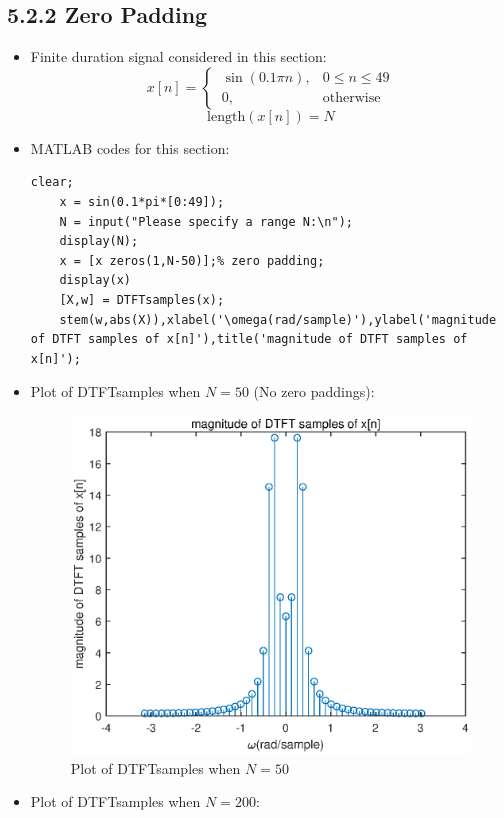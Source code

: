 \documentclass[onecolumn,oneside]{SUSTechHomework}
\begin{document}
\subsection*{5.2.2 Zero Padding}
\begin{itemize}
	\item Finite duration signal considered in this section:
$$
x[n]=\begin{cases}
	\ \sin (0.1 \pi n), & 0 \leq n \leq 49\\
	\ 0, & \text{otherwise} 
\end{cases}
$$
$$
\text{length}(x[n])=N
$$
	\item MATLAB codes for this section:
\begin{lstlisting}[title=\textbf{q5\_2\_2.m}]
	clear;
	x = sin(0.1*pi*[0:49]);
	N = input("Please specify a range N:\n");
	display(N);
	x = [x zeros(1,N-50)];% zero padding;
	display(x)
	[X,w] = DTFTsamples(x);
	stem(w,abs(X)),xlabel('\omega(rad/sample)'),ylabel('magnitude of DTFT samples of x[n]'),title('magnitude of DTFT samples of x[n]');
\end{lstlisting}
	\item Plot of DTFTsamples when $N=50$ (No zero paddings):
\begin{figure}[H]
	\centering
	\includegraphics[width=135mm]{pictures/q5_2_2_N50.eps}
	\caption{Plot of DTFTsamples when $N=50$}
\end{figure}
	\item Plot of DTFTsamples when $N=200$:
\begin{figure}[H]

\end{figure}
\end{itemize}
\end{document}
